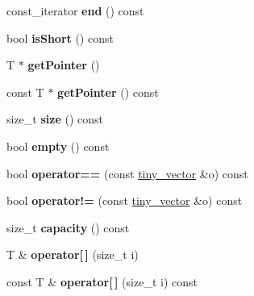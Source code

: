 \begin{DoxyCompactItemize}
\mbox{\label{classtiny__vector_a3bb03bf07c5ff8c399f872b986517a8a}} 
const\+\_\+iterator {\bfseries end} () const
\item 
\mbox{\label{classtiny__vector_add7bf234c302cae17599be10888602dc}} 
bool {\bfseries is\+Short} () const
\item 
\mbox{\label{classtiny__vector_a70e92c099f70ea1b467aa844c6f650bb}} 
T $\ast$ {\bfseries get\+Pointer} ()
\item 
\mbox{\label{classtiny__vector_a781a67804932ed6e8dab7ebf0e821cc5}} 
const T $\ast$ {\bfseries get\+Pointer} () const
\item 
\mbox{\label{classtiny__vector_a3ab9b2db3800195fe6f86819688b2a81}} 
size\+\_\+t {\bfseries size} () const
\item 
\mbox{\label{classtiny__vector_af619af30de2567c2ebf59fa153fac646}} 
bool {\bfseries empty} () const
\item 
\mbox{\label{classtiny__vector_af0287db76eea4b912cebfa4e8c7d3914}} 
bool {\bfseries operator==} (const \hyperlink{classtiny__vector}{tiny\+\_\+vector} \&o) const
\item 
\mbox{\label{classtiny__vector_a6096b3b4a67e4ed5b799dbefcf287ae6}} 
bool {\bfseries operator!=} (const \hyperlink{classtiny__vector}{tiny\+\_\+vector} \&o) const
\item 
\mbox{\label{classtiny__vector_ad5f5afd1ef031f9c9f5a0f4d5b816573}} 
size\+\_\+t {\bfseries capacity} () const
\item 
\mbox{\label{classtiny__vector_a15044ae7f34f7824c60a41e21bc7c438}} 
T \& {\bfseries operator\mbox{[}$\,$\mbox{]}} (size\+\_\+t i)
\item 
\mbox{\label{classtiny__vector_aec4dbc9aed743c50e6499e5b45f14f82}} 
const T \& {\bfseries operator\mbox{[}$\,$\mbox{]}} (size\+\_\+t i) const
\item 
\mbox{\label{classtiny__vector_a12b6a0fb5d9818bc0ee59bd4713f6724}} 

\end{DoxyCompactItemize}
